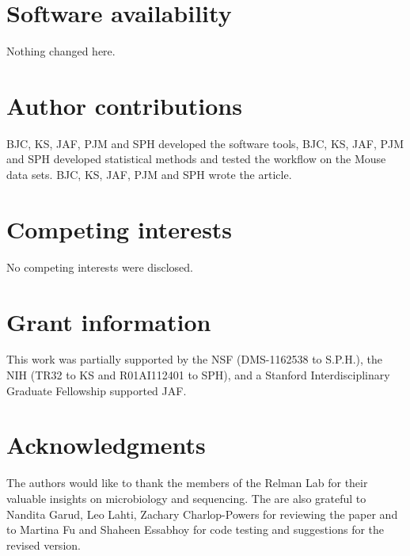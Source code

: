 \documentclass[9pt,a4paper]{extarticle}\usepackage[]{graphicx}\usepackage[]{color}
\begin{document}
\section*{Software availability}
Nothing changed here.



\section*{Author contributions}
BJC, KS, JAF, PJM and SPH developed the software tools,
BJC, KS, JAF, PJM  and SPH developed statistical
methods and tested the workflow on the Mouse  data sets.
 BJC,  KS, JAF, PJM and SPH wrote the article.
\section*{Competing interests}
No competing interests were disclosed.

\section*{Grant information}
This work was partially supported by the NSF (DMS-1162538 to S.P.H.), the NIH (TR32 to KS and R01AI112401 to SPH), and a Stanford Interdisciplinary Graduate Fellowship supported JAF.

\section*{Acknowledgments}
The authors would like to thank the members of the Relman Lab for their valuable insights on microbiology and sequencing.
The are also grateful to Nandita Garud, Leo Lahti, Zachary Charlop-Powers for reviewing the paper and to
Martina Fu and Shaheen Essabhoy for
code testing and suggestions for the revised version.

{\small
}
\end{document}
